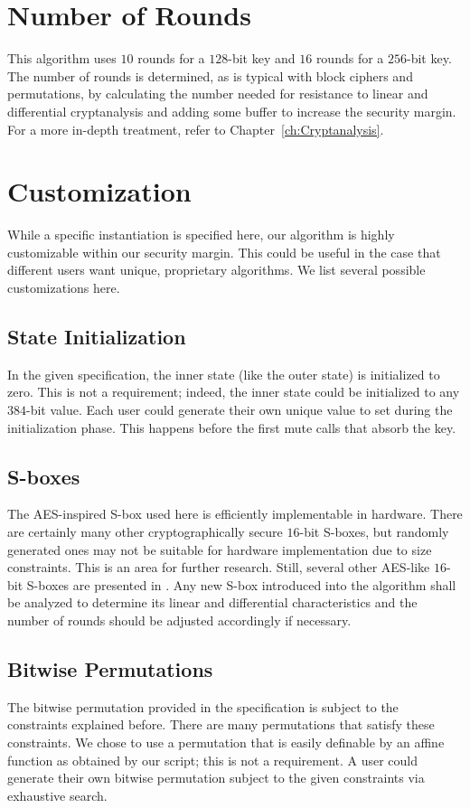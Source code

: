 

\section{Number of Rounds}
This algorithm uses $10$ rounds for a $128$-bit key and $16$ rounds for a $256$-bit key.
The number of rounds is determined, as is typical with block ciphers and permutations, by calculating the number needed for resistance to linear and differential cryptanalysis and adding some buffer to increase the security margin. 
For a more in-depth treatment, refer to Chapter~\ref{ch:Cryptanalysis}.

\section{Customization}
While a specific instantiation is specified here, our algorithm is highly customizable within our security margin.
This could be useful in the case that different users want unique, proprietary algorithms.
We list several possible customizations here.

\subsection{State Initialization}
In the given specification, the inner state (like the outer state) is initialized to zero.
This is not a requirement; indeed, the inner state could be initialized to any $384$-bit value.
Each user could generate their own unique value to set during the initialization phase.
This happens before the first mute calls that absorb the key.

\subsection{S-boxes}
The AES-inspired S-box used here is efficiently implementable in hardware.
There are certainly many other cryptographically secure $16$-bit S-boxes, but randomly generated ones may not be suitable for hardware implementation due to size constraints.
This is an area for further research.
Still, several other AES-like $16$-bit S-boxes are presented in \cite{Wood2013_SboxThesis}.
Any new S-box introduced into the algorithm shall be analyzed to determine its linear and differential characteristics and the number of rounds should be adjusted accordingly if necessary.

\subsection{Bitwise Permutations}
The bitwise permutation provided in the specification is subject to the constraints explained before.
There are many permutations that satisfy these constraints.
We chose to use a permutation that is easily definable by an affine function as obtained by our script; this is not a requirement.
A user could generate their own bitwise permutation subject to the given constraints via exhaustive search.


